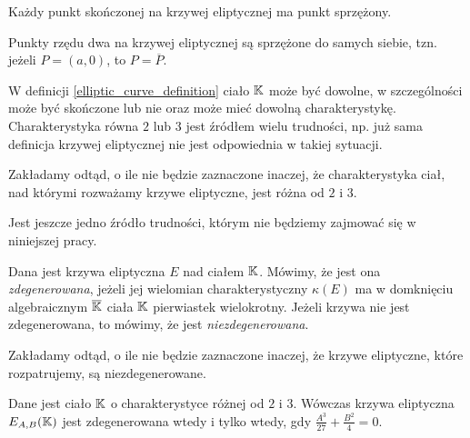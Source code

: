 \begin{fact}
Każdy punkt skończonej na krzywej eliptycznej ma punkt sprzężony.
\end{fact}

\begin{fact}
Punkty rzędu dwa na krzywej eliptycznej są sprzężone do samych siebie,
tzn. jeżeli $P = (a, 0)$, to $P = \overline{P}$.
\end{fact}

W definicji \ref{elliptic_curve_definition} ciało $\mathbb{K}$ może być dowolne,
w szczególności może być skończone lub nie
oraz może mieć dowolną charakterystykę.
Charakterystyka równa $2$ lub $3$ jest źródłem wielu trudności,
np. już sama definicja krzywej eliptycznej
nie jest odpowiednia w takiej sytuacji.

\begin{remark}
Zakładamy odtąd, o ile nie będzie zaznaczone inaczej,
że charakterystyka ciał, nad którymi rozważamy krzywe eliptyczne,
jest różna od $2$ i $3$.
\end{remark}

Jest jeszcze jedno źródło trudności,
którym nie będziemy zajmować się w niniejszej pracy.

\begin{definition}
Dana jest krzywa eliptyczna $E$ nad ciałem $\mathbb{K}$.
Mówimy, że jest ona \emph{zdegenerowana},
jeżeli jej wielomian charakterystyczny $\kappa(E)$
ma w domknięciu algebraicznym $\overline{\mathbb{K}}$ ciała $\mathbb{K}$
pierwiastek wielokrotny.
Jeżeli krzywa nie jest zdegenerowana,
to mówimy, że jest \emph{niezdegenerowana}.
\end{definition}

\begin{remark}
Zakładamy odtąd, o ile nie będzie zaznaczone inaczej,
że krzywe eliptyczne, które rozpatrujemy,
są niezdegenerowane.
\end{remark}

\begin{theorem}
Dane jest ciało $\mathbb{K}$ o charakterystyce różnej od $2$ i $3$.
Wówczas krzywa eliptyczna $E_{A,B}(\mathbb{K})$ jest zdegenerowana wtedy i tylko wtedy,
gdy $\frac{A^3}{27} + \frac{B^2}{4} = 0$.
\end{theorem}
